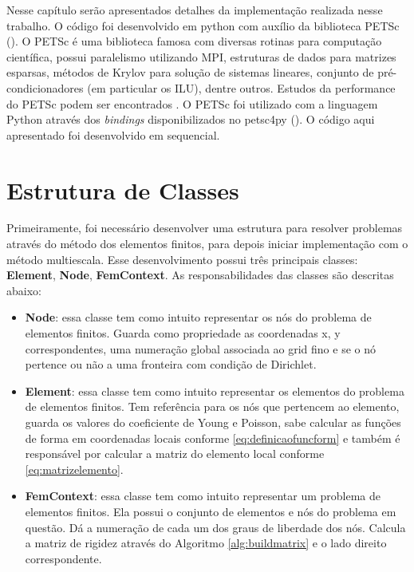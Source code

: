 Nesse capítulo serão apresentados detalhes da implementação realizada nesse trabalho. O código foi desenvolvido em python com auxílio da biblioteca PETSc (\citet{petsc-user-ref}). O PETSc é uma biblioteca famosa com diversas rotinas para computação científica, possui paralelismo utilizando MPI, estruturas de dados para matrizes esparsas, métodos de Krylov para solução de sistemas lineares, conjunto de pré-condicionadores (em particular os ILU), dentre outros. Estudos da performance do PETSc podem ser encontrados \citet{petsc-efficient}. O PETSc foi utilizado com a linguagem Python através dos \textit{bindings} disponibilizados no petsc4py (\citet{Dalcin2011}). O código aqui apresentado foi desenvolvido em sequencial. 


\section{Estrutura de Classes}

Primeiramente, foi necessário desenvolver uma estrutura para resolver problemas através do método dos elementos finitos, para depois iniciar implementação com o método multiescala. Esse desenvolvimento possui três principais classes: \textbf{Element}, \textbf{Node}, \textbf{FemContext}. As responsabilidades das classes são descritas abaixo:

\begin{itemize}
    \item \textbf{Node}: essa classe tem como intuito representar os nós do problema de elementos finitos. Guarda como propriedade as coordenadas x, y correspondentes, uma numeração global associada ao grid fino e se o nó pertence ou não a uma fronteira com condição de Dirichlet.
    \item \textbf{Element}: essa classe tem como intuito representar os elementos do problema de elementos finitos. Tem referência para os nós que pertencem ao elemento, guarda os valores do coeficiente de Young e Poisson, sabe calcular as funções de forma em coordenadas locais conforme \eqref{eq:definicaofuncform} e também é responsável por calcular a matriz do elemento local conforme \eqref{eq:matrizelemento}.
    \item \textbf{FemContext}: essa classe tem como intuito representar um problema de elementos finitos. Ela possui o conjunto de elementos e nós do problema em questão. Dá a numeração de cada um dos graus de liberdade dos nós. Calcula a matriz de rigidez através do Algoritmo \ref{alg:buildmatrix} e o lado direito correspondente. 
\end{itemize}

